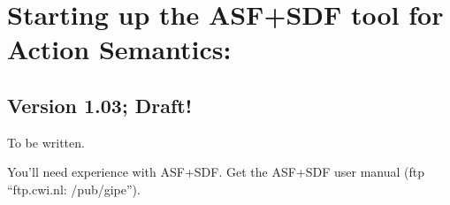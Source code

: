 
\raggedbottom
\setlength{\textwidth}{16cm}
\setlength{\textheight}{22cm}
\setlength{\oddsidemargin}{0.46cm}
\setlength{\evensidemargin}{0.46cm}

\newcommand{\asdf}{\mbox{ASF{\tt +}SDF}}


\newcommand{\actmod}[2]{
  \subsection{#2}
    \subsubsection{MetaNotation Module}
       \verbatimfile{#1/#2.asd}
    \subsubsection{Generated \asdf}
       \verbatimfile{#1/#2.syn}
       \verbatimfile{#1/#2.eqs}
    \newpage
}

\newcommand{\asdfmod}[2]{
  \subsubsection{#2}
  \verbatimfile{#1/#2.syn}
  \verbatimfile{#1/#2.eqs}
}

\newcommand{\asdfmodsyn}[2]{
  \subsubsection{#2}
  \verbatimfile{#1/#2.syn}
}



\section*{Starting up the ASF+SDF tool for Action Semantics:}
\subsection*{Version 1.03; Draft!}


 To be written.

 You'll need  experience with ASF+SDF. Get the
 ASF+SDF user manual (ftp ``ftp.cwi.nl: /pub/gipe'').


